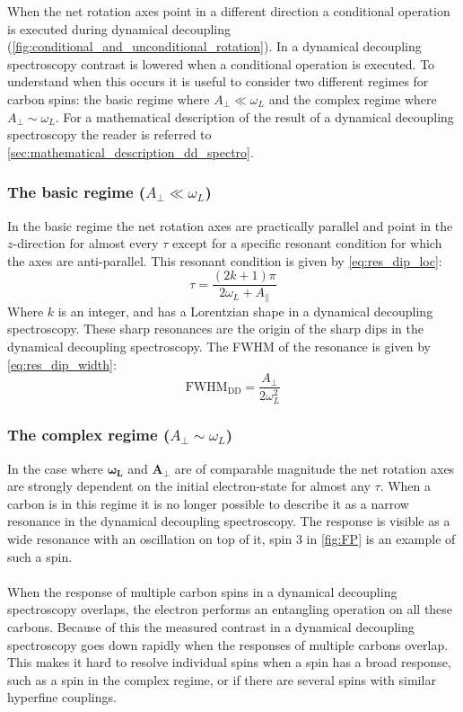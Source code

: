 When the net rotation axes point in a different direction a conditional operation is executed during dynamical decoupling (\cref{fig:conditional_and_unconditional_rotation}).
In a dynamical decoupling spectroscopy contrast is lowered when a conditional operation is executed.
To understand when this occurs it is useful to consider two different regimes for carbon spins: the basic regime where $A_\perp \ll \omega_L$ and the complex regime where $A_\perp \sim \omega_L$.
For a mathematical description of the result of a dynamical decoupling spectroscopy the reader is referred to \cref{sec:mathematical_description_dd_spectro}.

\subsubsection{The basic regime ($A_\perp \ll \omega_L$)}
In the basic regime the net rotation axes are practically parallel and point in the $z$-direction for almost every $\tau$ except for a specific resonant condition for which the axes are anti-parallel.
This resonant condition is given by \cref{eq:res_dip_loc}:
 \begin{equation}
\tau = \frac{(2k+1)\pi}{2 \omega_L + A_\parallel}
\label{eq:res_dip_loc}
\end{equation}
Where $k$ is an integer, and has a Lorentzian shape in a dynamical decoupling spectroscopy.
These sharp resonances are the origin of the sharp dips in the dynamical decoupling spectroscopy.
The FWHM of the resonance is given by \cref{eq:res_dip_width}:
 \begin{equation}
\mathrm{FWHM_{DD}} = \frac{A_\perp}{2 \omega_L^2}
\label{eq:res_dip_width}
\end{equation}


\subsubsection{The complex regime ($A_\perp \sim \omega_L$)}

In the case where $\bm{\omega_L}$ and $\bm{A_\perp}$ are of comparable magnitude the net rotation axes are strongly dependent on the initial electron-state for almost any $\tau$.
When a carbon is in this regime it is no longer possible to describe it as a narrow resonance in the dynamical decoupling spectroscopy.
The response is visible as a wide resonance with an oscillation on top of it, spin 3 in \cref{fig:FP} is an example of such a spin.

\paragraph{ }
When the response of multiple carbon spins in a dynamical decoupling spectroscopy overlaps, the electron performs an entangling operation on all these carbons.
Because of this the measured contrast in a dynamical decoupling spectroscopy goes down rapidly when the responses of multiple carbons overlap.
This makes it hard to resolve individual spins when a spin has a broad response, such as a spin in the complex regime, or if there are several spins with similar hyperfine couplings.


